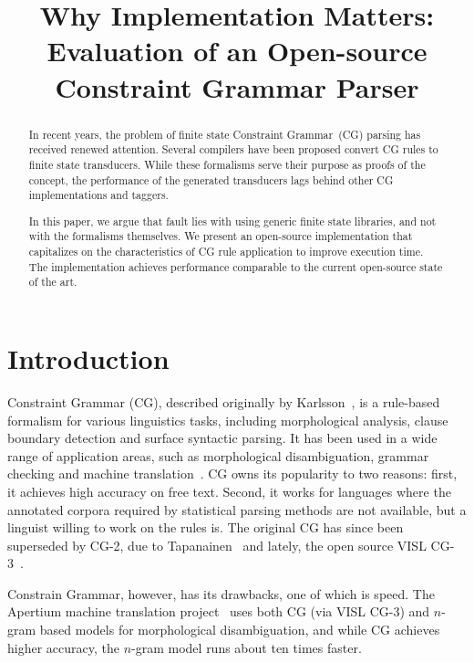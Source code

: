 \documentclass[11pt]{article}
\title{Why Implementation Matters: Evaluation of an Open-source Constraint Grammar Parser}
\date{}
\begin{document}
\maketitle

\begin{abstract}
  In recent years, the problem of finite state Constraint Grammar~(CG) parsing
  has received renewed attention. Several compilers have been proposed
  convert CG rules to finite state transducers. While these formalisms serve
  their purpose as proofs of the concept, the performance of the generated
  transducers lags behind other CG implementations and taggers.
  
  In this paper, we argue that fault lies with using generic finite state
  libraries, and not with the formalisms themselves. We present an open-source
  implementation that capitalizes on the characteristics of CG rule
  application to improve execution time. The implementation achieves performance
  comparable to the current open-source state of the art.
\end{abstract}



\section{Introduction}

Constraint Grammar (CG), described originally by Karlsson~,
is a rule-based formalism for various linguistics tasks, including morphological
analysis, clause boundary detection and surface syntactic parsing. It has
been used in a wide range of application areas, such as morphological
disambiguation, grammar checking and machine translation~\cite{Bick:2011}. CG
owns its popularity to two reasons: first, it achieves high accuracy on free
text. Second, it works for languages where the annotated corpora required by
statistical parsing methods are not available, but a linguist willing to work on
the rules is. The original CG has since been superseded by CG-2, due to
Tapanainen~ and lately, the open source VISL
CG-3~\cite{Bick:2000,Didriksen:2011}.

Constrain Grammar, however, has its drawbacks, one of which is speed. The
Apertium machine translation project~\cite{Apertium:2011} uses both CG (via
VISL CG-3) and $n$-gram based models for morphological disambiguation, and while
CG achieves higher accuracy, the $n$-gram model runs about ten times faster.
\end{document}
